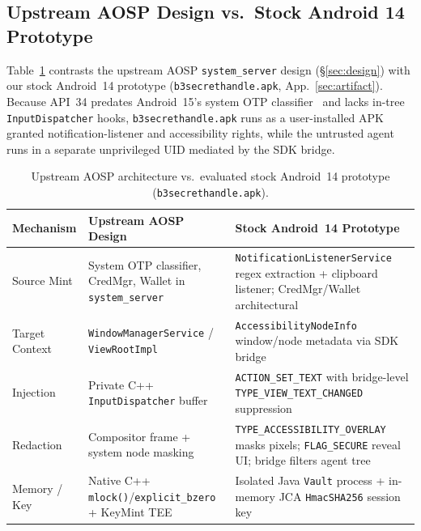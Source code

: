 \documentclass[sigconf,10pt]{acmart}
\theoremstyle{acmplain}%
\begin{document}
\subsection{Upstream AOSP Design vs.\ Stock Android 14 Prototype}
\label{sec:aosp_vs_stock}

Table~\ref{tab:aosp_vs_stock} contrasts the upstream AOSP \texttt{system\_server} design (\S\ref{sec:design}) with our stock Android~14 prototype (\texttt{b3secrethandle.apk}, App.~\ref{sec:artifact}). Because API~34 predates Android~15's system OTP classifier~\cite{android15privacy} and lacks in-tree \texttt{InputDispatcher} hooks, \texttt{b3secrethandle.apk} runs as a user-installed APK granted notification-listener and accessibility rights, while the untrusted agent runs in a separate unprivileged UID mediated by the SDK bridge.

\begin{table}[t]
\centering
\caption{Upstream AOSP architecture vs.\ evaluated stock Android~14 prototype (\texttt{b3secrethandle.apk}).}
\label{tab:aosp_vs_stock}
\footnotesize
\renewcommand{\arraystretch}{1.05}
\begin{tabularx}{\columnwidth}{@{}>{\raggedright\arraybackslash}p{1.5cm}>{\raggedright\arraybackslash}p{2.7cm}>{\raggedright\arraybackslash}X@{}}
\toprule
Mechanism & Upstream AOSP Design & Stock Android~14 Prototype \\
\midrule
Source Mint & System OTP classifier, CredMgr, Wallet in \texttt{system\_server} & \texttt{Notification\allowbreak ListenerService} regex extraction + clipboard listener; CredMgr/Wallet architectural \\
Target Context & \texttt{Window\allowbreak ManagerService} / \texttt{ViewRootImpl} & \texttt{AccessibilityNodeInfo} window/node metadata via SDK bridge \\
Injection & Private C++ \texttt{InputDispatcher} buffer & \texttt{ACTION\_SET\_TEXT} with bridge-level \texttt{TYPE\_VIEW\_TEXT\_CHANGED} suppression \\
Redaction & Compositor frame + system node masking & \texttt{TYPE\_\allowbreak ACCESSIBILITY\_\allowbreak OVERLAY} masks pixels; \texttt{FLAG\_SECURE} reveal UI; bridge filters agent tree \\
Memory / Key & Native C++ \texttt{mlock()}/\allowbreak\texttt{explicit\_bzero} + KeyMint TEE & Isolated Java \texttt{Vault} process + in-memory JCA \texttt{HmacSHA256} session key \\
\bottomrule
\end{tabularx}
\end{table}
\end{document}
